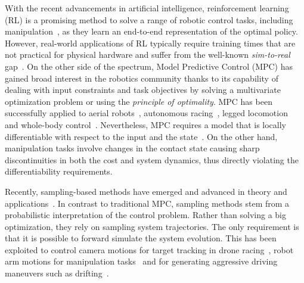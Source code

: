 With the recent advancements in artificial intelligence, reinforcement learning (RL) is a promising method to solve a range of robotic control tasks, including manipulation~\cite{finn2016deep}, as they learn an end-to-end representation of the optimal policy. However, real-world applications of RL typically require training times that are not practical for physical hardware and suffer from the well-known \emph{sim-to-real} gap~\cite{chebotar2019closing}. 
On the other side of the spectrum, Model Predictive Control (MPC) has gained broad interest in the robotics community thanks to its capability of dealing with input constraints and task objectives by solving a multivariate optimization problem or using the \emph{principle of optimality}. 
MPC has been successfully applied to aerial robots~\cite{brunner2020trajectory}, autonomous racing~\cite{liniger2015optimization}, legged locomotion~\cite{grandia2019frequency} and whole-body control~\cite{minniti2019whole}. Nevertheless, MPC requires a model that is locally differentiable with respect to the input and the state~\cite{buchli2017optimal}. On the other hand, manipulation tasks involve changes in the contact state causing sharp discontinuities in both the cost and system dynamics, thus directly violating the differentiability requirements. 

Recently, sampling-based methods have emerged and advanced in theory and applications~\cite{lee_aggressive_2020,abraham_model-based_2020,williams_information_nodate,williams_information_2017,rajamaki_augmenting_2017}. 
In contrast to traditional MPC, sampling methods stem from a probabilistic interpretation of the control problem. 
Rather than solving a big optimization, they rely on sampling system trajectories. The only requirement is that it is possible to forward simulate the system evolution. This has been exploited to control camera motions for target tracking in drone racing~\cite{lee_aggressive_2020}, robot arm motions for manipulation tasks~\cite{abraham_model-based_2020} and for generating aggressive driving maneuvers such as drifting~\cite{williams_information_nodate, williams_information_2017}. 

